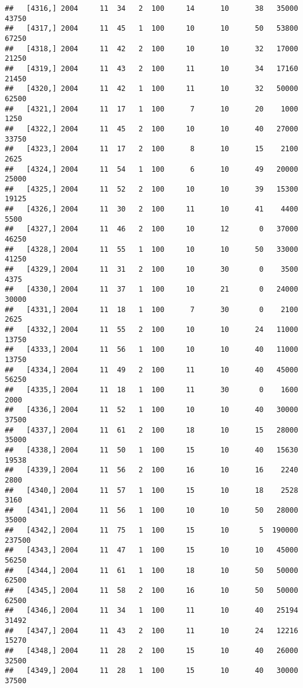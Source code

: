 \documentclass{article}\usepackage[]{graphicx}\usepackage[]{color}
\makeatletter
\newenvironment{kframe}{%
 \def\at@end@of@kframe{}%
 \ifinner\ifhmode%
  \def\at@end@of@kframe{\end{minipage}}%
  \begin{minipage}{\columnwidth}%
 \fi\fi%
 \def\FrameCommand##1{\hskip\@totalleftmargin \hskip-\fboxsep
 \colorbox{shadecolor}{##1}\hskip-\fboxsep
     \hskip-\linewidth \hskip-\@totalleftmargin \hskip\columnwidth}%
 \MakeFramed {\advance\hsize-\width
   \@totalleftmargin\z@ \linewidth\hsize
   \@setminipage}}%
 {\par\unskip\endMakeFramed%
 \at@end@of@kframe}
\newenvironment{knitrout}{}{} %
\makeatother
\begin{document}
\begin{knitrout}
\begin{kframe}
\begin{verbatim}
##   [4316,] 2004     11  34   2  100     14      10      38   35000   43750
##   [4317,] 2004     11  45   1  100     10      10      50   53800   67250
##   [4318,] 2004     11  42   2  100     10      10      32   17000   21250
##   [4319,] 2004     11  43   2  100     11      10      34   17160   21450
##   [4320,] 2004     11  42   1  100     11      10      32   50000   62500
##   [4321,] 2004     11  17   1  100      7      10      20    1000    1250
##   [4322,] 2004     11  45   2  100     10      10      40   27000   33750
##   [4323,] 2004     11  17   2  100      8      10      15    2100    2625
##   [4324,] 2004     11  54   1  100      6      10      49   20000   25000
##   [4325,] 2004     11  52   2  100     10      10      39   15300   19125
##   [4326,] 2004     11  30   2  100     11      10      41    4400    5500
##   [4327,] 2004     11  46   2  100     10      12       0   37000   46250
##   [4328,] 2004     11  55   1  100     10      10      50   33000   41250
##   [4329,] 2004     11  31   2  100     10      30       0    3500    4375
##   [4330,] 2004     11  37   1  100     10      21       0   24000   30000
##   [4331,] 2004     11  18   1  100      7      30       0    2100    2625
##   [4332,] 2004     11  55   2  100     10      10      24   11000   13750
##   [4333,] 2004     11  56   1  100     10      10      40   11000   13750
##   [4334,] 2004     11  49   2  100     11      10      40   45000   56250
##   [4335,] 2004     11  18   1  100     11      30       0    1600    2000
##   [4336,] 2004     11  52   1  100     10      10      40   30000   37500
##   [4337,] 2004     11  61   2  100     18      10      15   28000   35000
##   [4338,] 2004     11  50   1  100     15      10      40   15630   19538
##   [4339,] 2004     11  56   2  100     16      10      16    2240    2800
##   [4340,] 2004     11  57   1  100     15      10      18    2528    3160
##   [4341,] 2004     11  56   1  100     10      10      50   28000   35000
##   [4342,] 2004     11  75   1  100     15      10       5  190000  237500
##   [4343,] 2004     11  47   1  100     15      10      10   45000   56250
##   [4344,] 2004     11  61   1  100     18      10      50   50000   62500
##   [4345,] 2004     11  58   2  100     16      10      50   50000   62500
##   [4346,] 2004     11  34   1  100     11      10      40   25194   31492
##   [4347,] 2004     11  43   2  100     11      10      24   12216   15270
##   [4348,] 2004     11  28   2  100     15      10      40   26000   32500
##   [4349,] 2004     11  28   1  100     15      10      40   30000   37500

\end{verbatim}
\end{kframe}
\end{knitrout}
\end{document}
